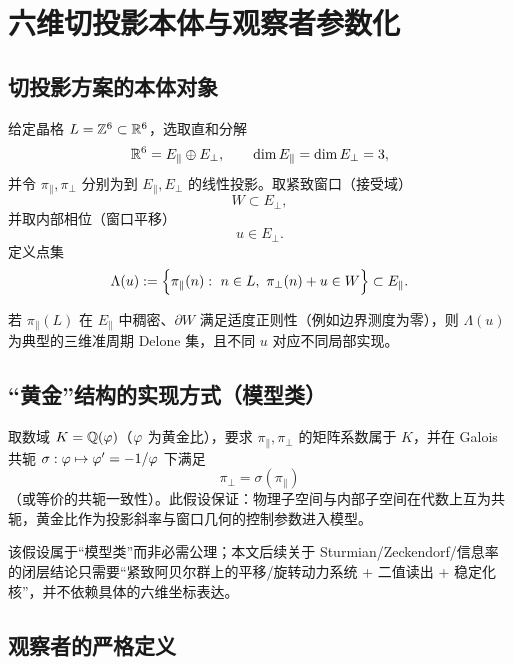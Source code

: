 \section{六维切投影本体与观察者参数化}

\subsection{切投影方案的本体对象}

\begin{definition}[切投影数据]\label{def:cap-data}
给定晶格 $L=\mathbb{Z}^6\subset\mathbb{R}^6$，选取直和分解
\[
\mathbb{R}^6=E_{\parallel}\oplus E_{\perp},\qquad \dim E_{\parallel}=\dim E_{\perp}=3,
\]
并令 $\pi_{\parallel},\pi_{\perp}$ 分别为到 $E_{\parallel},E_{\perp}$ 的线性投影。取紧致窗口（接受域）
\[
W\subset E_{\perp},
\]
并取内部相位（窗口平移）
\[
u\in E_{\perp}.
\]
定义点集
\[
\Lambda(u):=\Bigl\{\pi_{\parallel}(n):\ n\in L,\ \pi_{\perp}(n)+u\in W\Bigr\}\subset E_{\parallel}.
\]
\end{definition}

\begin{remark}
若 $\pi_{\parallel}(L)$ 在 $E_{\parallel}$ 中稠密、$\partial W$ 满足适度正则性（例如边界测度为零），则 $\Lambda(u)$ 为典型的三维准周期 Delone 集，且不同 $u$ 对应不同局部实现。
\end{remark}

\subsection{“黄金”结构的实现方式（模型类）}

\begin{assumption}[黄金域参数化]\label{assump:golden-field}
取数域 $K=\mathbb{Q}(\varphi)$（$\varphi$ 为黄金比），要求 $\pi_{\parallel},\pi_{\perp}$ 的矩阵系数属于 $K$，并在 Galois 共轭 $\sigma:\varphi\mapsto \varphi'=-1/\varphi$ 下满足
\[
\pi_{\perp}=\sigma(\pi_{\parallel})
\]
（或等价的共轭一致性）。此假设保证：物理子空间与内部子空间在代数上互为共轭，黄金比作为投影斜率与窗口几何的控制参数进入模型。
\end{assumption}

\begin{remark}
该假设属于“模型类”而非必需公理；本文后续关于 Sturmian/Zeckendorf/信息率的闭层结论只需要“紧致阿贝尔群上的平移/旋转动力系统 + 二值读出 + 稳定化核”，并不依赖具体的六维坐标表达。
\end{remark}

\subsection{观察者的严格定义}

